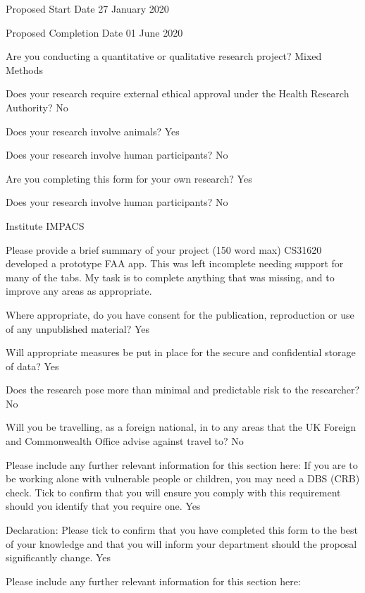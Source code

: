 Proposed Start Date
27 January 2020

Proposed Completion Date
01 June 2020

Are you conducting a quantitative or qualitative research project?
Mixed Methods

Does your research require external ethical approval under the Health Research
Authority?
No

Does your research involve animals?
Yes

Does your research involve human participants?
No

Are you completing this form for your own research?
Yes

Does your research involve human participants?
No

Institute
IMPACS

Please provide a brief summary of your project (150 word max)
CS31620 developed a prototype FAA app. This was left incomplete needing support for
many of the tabs. My task is to complete anything that was missing, and to improve any
areas as appropriate.

Where appropriate, do you have consent for the publication, reproduction or use of
any unpublished material?
Yes

Will appropriate measures be put in place for the secure and confidential storage of
data?
Yes

Does the research pose more than minimal and predictable risk to the researcher?
No

Will you be travelling, as a foreign national, in to any areas that the UK Foreign and
Commonwealth Office advise against travel to?
No

Please include any further relevant information for this section here:
If you are to be working alone with vulnerable people or children, you may need a
DBS (CRB) check. Tick to confirm that you will ensure you comply with this 
requirement should you identify that you require one.
Yes

Declaration: Please tick to confirm that you have completed this form to the best of
your knowledge and that you will inform your department should the proposal
significantly change.
Yes

Please include any further relevant information for this section here: